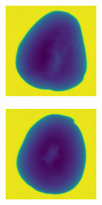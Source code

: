 \documentclass[11pt]{article}
\begin{document}
\begin{figure}[!h]
\begin{subfigure}[b]{0.22\textwidth}
         \caption{}
         \label{fig:hollow_23}
     \end{subfigure}
     \\
    \begin{subfigure}[b]{0.22\textwidth}
         \centering
         \includegraphics[width=\textwidth]{figurer/potato_dataset/hollow/hollow_24.jpg}
         \caption{}
         \label{fig:hollow_24}
     \end{subfigure}
     \hfill
     \begin{subfigure}[b]{0.22\textwidth}
         \centering
         \includegraphics[width=\textwidth]{figurer/potato_dataset/hollow/hollow_25.jpg}

\end{subfigure}
\end{figure}
\end{document}
